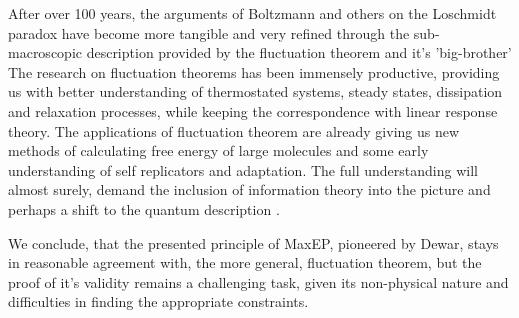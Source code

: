 \documentclass[a4paper,12pt]{article}
\begin{document}
After over 100 years, the arguments of Boltzmann and others on the Loschmidt paradox have become more tangible and very refined through the sub-macroscopic description provided by the fluctuation theorem and it's 'big-brother' 
The research on fluctuation theorems has been immensely productive, providing us with better understanding of thermostated systems, steady states, dissipation and relaxation processes, while keeping the correspondence with linear response theory. 
The applications of fluctuation theorem are already giving us new methods of calculating free energy of large molecules and some early understanding of self replicators and adaptation. The full understanding will almost surely, demand the inclusion of information theory into the picture and perhaps a shift to the quantum description \cite{Kurchan:2000uh}.

We conclude, that the presented principle of MaxEP, pioneered by Dewar, stays in reasonable agreement with, the more general, fluctuation theorem, but the proof of it's validity remains a challenging task, given its non-physical nature and difficulties in finding the appropriate constraints.
  

\newpage



\end{document}
